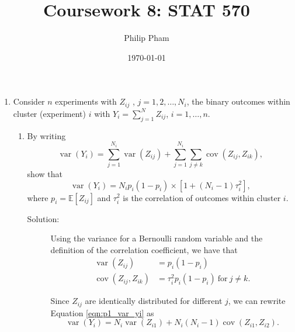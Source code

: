 \documentclass[letterpaper,11pt]{article}
\title{Coursework 8: STAT 570}
\author{Philip Pham}
\date{\today}
\begin{document}
\maketitle
\begin{enumerate}
\item Consider $n$ experiments with $Z_{ij}$ , $j = 1,2,\ldots, N_i$, the binary
  outcomes within cluster (experiment) $i$ with $Y_i = \sum^N_{j=1} Z_{ij}$,
  $i = 1,\ldots,n$.
  \begin{enumerate}
  \item By writing
    \begin{equation}
      \operatorname{var}\left(Y_i\right)
      = \sum_{j=1}^{N_i} \operatorname{var}\left(Z_{ij}\right)
      + \sum_{j=1}^{N_i}\sum_{j \neq k} \operatorname{cov}\left(Z_{ij}, Z_{ik}\right),
      \label{eqn:p1_var_yi}
    \end{equation}
    show that
    \begin{equation}
      \operatorname{var}\left(Y_i\right)
      = N_ip_i\left(1 - p_i\right) \times
      \left[1 + \left(N_i - 1\right)\tau_i^2\right],
      \label{eqn:p1_var_yi_result}
    \end{equation}
    where $p_i = \mathbb{E}\left[Z_{ij}\right]$ and $\tau_i^2$ is the
    correlation of outcomes within cluster $i$.

    \begin{description}
    \item[Solution:] Using the variance for a Bernoulli random variable and the
      definition of the correlation coefficient, we have that
      \begin{align}
        \operatorname{var}\left(Z_{ij}\right)
        &= p_i\left(1 - p_i\right) \label{eqn:p1_var_cov}\\
        \operatorname{cov}\left(Z_{ij}, Z_{ik}\right)
        &= \tau_i^2p_i\left(1 - p_i\right)~\text{for}~j \neq k.
          \nonumber
      \end{align}
      
      Since $Z_{ij}$ are identically distributed for different $j$, we can
      rewrite Equation \ref{eqn:p1_var_yi} as
      \begin{equation}
        \operatorname{var}\left(Y_i\right)
        = N_i\operatorname{var}\left(Z_{i1}\right) +
        N_i\left(N_i - 1\right)\operatorname{cov}\left(Z_{i1},Z_{i2}\right).
        \label{eqn:p1_var_yi_simplified} 
      \end{equation}


\end{description}
\end{enumerate}
\end{enumerate}
\end{document}
